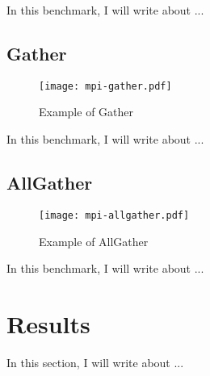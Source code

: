             In this benchmark, I will write about ...

        \subsection{Gather}

            \begin{figure}[!tb]
                \centering%
                \caption{Example of \mpi Gather}%
                \label{fig:software-stack}%
                \texttt{[image: mpi-gather.pdf]}%
            \end{figure}

            In this benchmark, I will write about ...

        \subsection{AllGather}

            \begin{figure}[!tb]
                \centering%
                \caption{Example of \mpi AllGather}%
                \label{fig:software-stack}%
                \texttt{[image: mpi-allgather.pdf]}%
            \end{figure}

            In this benchmark, I will write about ...

    \section{Results}

        In this section, I will write about ...